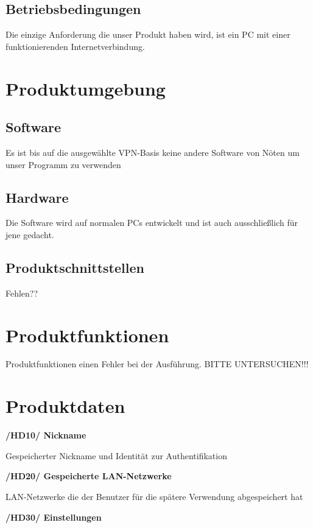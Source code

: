 \documentclass[a4paper,12pt]{scrreprt}
\begin{document}
	
		
		
	\section{Betriebsbedingungen}
	Die einzige Anforderung die unser Produkt haben wird, ist ein PC mit einer funktionierenden Internetverbindung. 	
		
\chapter{Produktumgebung}
	
	\section{Software}
		
		Es ist bis auf die ausgewählte VPN-Basis keine andere Software von Nöten um unser Programm zu verwenden
		
	\section{Hardware}
		
	Die Software wird auf normalen PCs entwickelt und ist auch ausschließlich für jene gedacht. 
		
		
	\section{Produktschnittstellen}
		
	Fehlen??	
		
\chapter{Produktfunktionen}
	Produktfunktionen einen Fehler bei der Ausführung. BITTE UNTERSUCHEN!!!
	
\chapter{Produktdaten}
	
	\textbf{/HD10/ Nickname}	
	
	Gespeicherter Nickname und Identität zur Authentifikation
	
	\textbf{/HD20/ Gespeicherte LAN-Netzwerke}
	
	LAN-Netzwerke die der Benutzer für die spätere Verwendung abgespeichert hat
	
	\textbf{/HD30/ Einstellungen}
	
\end{document}
